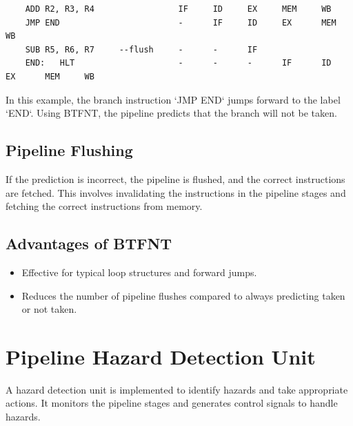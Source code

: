 \documentclass{report}
\begin{document}
\begin{verbatim}
    ADD R2, R3, R4                 IF     ID     EX     MEM     WB
    JMP END                        -      IF     ID     EX      MEM     WB
    SUB R5, R6, R7     --flush     -      -      IF
    END:   HLT                     -      -      -      IF      ID      EX      MEM     WB
\end{verbatim}
In this example, the branch instruction `JMP END` jumps forward to the label `END`. Using BTFNT, the pipeline predicts that the branch will not be taken.

\subsection*{Pipeline Flushing}
If the prediction is incorrect, the pipeline is flushed, and the correct instructions are fetched. This involves invalidating the instructions in the pipeline stages and fetching the correct instructions from memory.

\subsection*{Advantages of BTFNT}
\begin{itemize}
    \item Effective for typical loop structures and forward jumps.
    \item Reduces the number of pipeline flushes compared to always predicting taken or not taken.
\end{itemize}

\section*{Pipeline Hazard Detection Unit}
A hazard detection unit is implemented to identify hazards and take appropriate actions. It monitors the pipeline stages and generates control signals to handle hazards.
\end{document}
